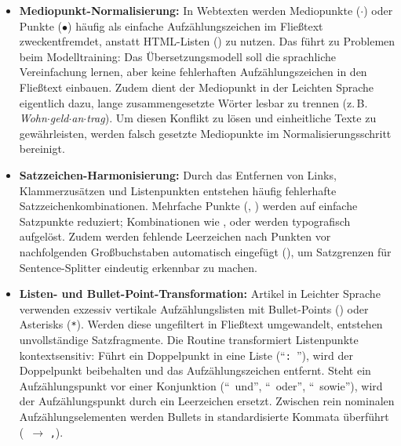 \begin{itemize}
    \item \textbf{Mediopunkt-Normalisierung:} In Webtexten werden Mediopunkte ($\cdot$) oder Punkte ($\bullet$) häufig als einfache Aufzählungszeichen im Fließtext zweckentfremdet, anstatt HTML-Listen () zu nutzen. Das führt zu Problemen beim Modelltraining: Das Übersetzungsmodell soll die sprachliche Vereinfachung lernen, aber keine fehlerhaften Aufzählungszeichen in den Fließtext einbauen. Zudem dient der Mediopunkt in der Leichten Sprache eigentlich dazu, lange zusammengesetzte Wörter lesbar zu trennen (z.\,B. \textit{Wohn$\cdot$geld$\cdot$an$\cdot$trag}). Um diesen Konflikt zu lösen und einheitliche Texte zu gewährleisten, werden falsch gesetzte Mediopunkte im Normalisierungsschritt bereinigt.
    \item \textbf{Satzzeichen-Harmonisierung:} Durch das Entfernen von Links, Klammerzusätzen und Listenpunkten entstehen häufig fehlerhafte Satzzeichenkombinationen. Mehrfache Punkte (, ) werden auf einfache Satzpunkte reduziert; Kombinationen wie ,  oder  werden typografisch aufgelöst. Zudem werden fehlende Leerzeichen nach Punkten vor nachfolgenden Großbuchstaben automatisch eingefügt (), um Satzgrenzen für Sentence-Splitter eindeutig erkennbar zu machen.
    \item \textbf{Listen- und Bullet-Point-Transformation:} Artikel in Leichter Sprache verwenden exzessiv vertikale Aufzählungslisten mit Bullet-Points (\textbullet) oder Asterisks (\texttt{*}). Werden diese ungefiltert in Fließtext umgewandelt, entstehen unvollständige Satzfragmente. Die Routine transformiert Listenpunkte kontextsensitiv: Führt ein Doppelpunkt in eine Liste (\enquote{\texttt{:}\ \textbullet}), wird der Doppelpunkt beibehalten und das Aufzählungszeichen entfernt. Steht ein Aufzählungspunkt vor einer Konjunktion (\enquote{\textbullet\ und}, \enquote{\textbullet\ oder}, \enquote{\textbullet\ sowie}), wird der Aufzählungspunkt durch ein Leerzeichen ersetzt. Zwischen rein nominalen Aufzählungselementen werden Bullets in standardisierte Kommata überführt (\textbullet\ $\to$ \texttt{,}).

\end{itemize}
